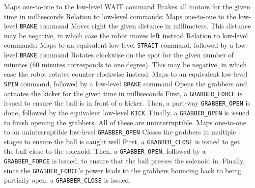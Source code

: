     {Maps one-to-one to the low-level WAIT command}
    {Brakes all motors for the given time in milliseconds}
    {Relation to low-level commands: Maps one-to-one to the low-level
     \texttt{BRAKE} command}
    {Moves right the given distance in millimeters. This distance may be
     negative, in which case the robot moves left instead}
    {Relation to low-level commands: Maps to an equivalent low-level
     \texttt{STRAIT} command, followed by a low-level \texttt{BRAKE} command}
    {Rotates clockwise on the spot for the given number of minutes (60 minutes
     corresponds to one degree). This may be negative, in which case the robot
     rotates counter-clockwise instead.}
    {Maps to an equivalent low-level \texttt{SPIN} command, followed by a
     low-level \texttt{BRAKE} command}
    {Opens the grabbers and actuates the kicker for the given time in
     milliseconds}
    {First, a \texttt{GRABBER\_FORCE} is issued to ensure the ball is in front
     of a kicker. Then, a part-way \texttt{GRABBER\_OPEN} is done, followed by
     the equivalent low-level \texttt{KICK}. Finally, a \texttt{GRABBER\_OPEN}
     is issued to finish opening the grabbers. All of these are
     uninterruptible.}
    {Maps one-to-one to an uninterruptible low-level \texttt{GRABBER\_OPEN}}
    {Closes the grabbers in multiple stages to ensure the ball is caught well}
    {First, a \texttt{GRABBER\_CLOSE} is issued to get the ball close to the
     solenoid.  Then, a \texttt{GRABBER\_OPEN}, followed by a
     \texttt{GRABBER\_FORCE} is issued, to ensure that the ball presses the
     solenoid in. Finally, since the \texttt{GRABBER\_FORCE}'s power leads to
     the grabbers bouncing back to being partially open, a
     \texttt{GRABBER\_CLOSE} is issued.}
